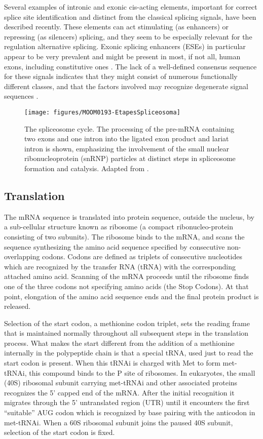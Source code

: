 Several examples of intronic and exonic cis-acting elements, important
for correct splice site identification and distinct from the classical
splicing signals, have been described recently.  These elements can
act stimulating (as enhancers) or repressing (as silencers)
splicing, and they seem to be especially relevant for the regulation
alternative splicing. Exonic splicing enhancers (ESEs) in particular
appear to be very prevalent and might be present in most, if not all,
human exons, including constitutive ones
\citep{cartegni:2002}.  The lack of a well-defined consensus sequence
for these signals indicates that they might consist of numerous
functionally different classes, and that the factors involved
may recognize degenerate signal sequences \citep{cartegni:2002}.

\begin{figure}
\begin{center}
\texttt{[image: figures/MOOM0193-EtapesSpliceosoma]}
\caption{The spliceosome cycle. The processing
of the pre-mRNA containing two exons and one intron into the ligated
exon product and lariat intron is shown, emphasizing the involvement
of the small nuclear ribonucleoprotein (snRNP) particles at distinct
steps in spliceosome formation and catalysis. Adapted from
\cite{burge:1999a}.} \label{splicing process}
\end{center}
\end{figure}


\subsection*{Translation}

The mRNA sequence is translated into protein sequence, outside the
nucleus, by a sub-cellular structure known as ribosome (a compact
ribonucleo-protein consisting of two subunits). The ribosome binds to
the mRNA, and scans the sequence synthesizing the amino acid sequence
specified by consecutive non-overlapping codons. Codons are defined as
triplets of consecutive nucleotides which are recognized by the
transfer RNA (tRNA) with the corresponding attached amino
acid. Scanning of the mRNA proceeds until the ribosome finds one of
the three codons not specifying amino acids (the Stop Codons). At that
point, elongation of the amino acid sequence ends and the final
protein product is released.

Selection of the start codon, a methionine codon triplet, sets the
reading frame that is maintained normally throughout all subsequent
steps in the translation process. What makes the start different from
the addition of a methionine internally in the polypeptide chain is
that a special tRNA, used just to read the start codon is present.
When this tRNAi is charged with Met to form met-tRNAi, this compound
binds to the P site of ribosomes. In eukaryotes, the small (40S)
ribosomal subunit carrying met-tRNAi and other associated proteins
recognizes the 5' capped end of the mRNA. After the initial
recognition it migrates through the 5' untranslated region (UTR) until
it encounters the first ``suitable'' AUG codon which is recognized by
base pairing with the anticodon in met-tRNAi. When a 60S ribosomal
subunit joins the paused 40S subunit, selection of the start codon is
fixed.

